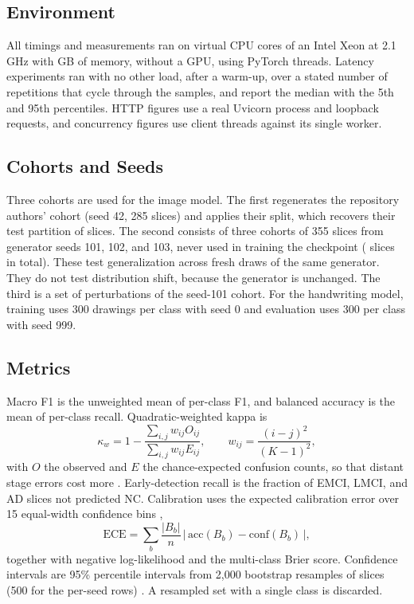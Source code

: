 \documentclass[conference]{IEEEtran}
\begin{document}
\subsection{Environment}
All timings and measurements ran on \CpuCount{} virtual CPU cores of an Intel Xeon at 2.1 GHz with \RamGb{} GB of memory, without a GPU, using \TorchThreads{} PyTorch threads. Latency experiments ran with no other load, after a warm-up, over a stated number of repetitions that cycle through the samples, and report the median with the 5th and 95th percentiles. HTTP figures use a real Uvicorn process and loopback requests, and concurrency figures use client threads against its single worker.

\subsection{Cohorts and Seeds}
Three cohorts are used for the image model. The first regenerates the repository authors' cohort (seed 42, 285 slices) and applies their split, which recovers their test partition of \EOneN{} slices. The second consists of three cohorts of 355 slices from generator seeds 101, 102, and 103, never used in training the checkpoint (\PoolN{} slices in total). These test generalization across fresh draws of the same generator. They do not test distribution shift, because the generator is unchanged. The third is a set of perturbations of the seed-101 cohort. For the handwriting model, training uses 300 drawings per class with seed 0 and evaluation uses 300 per class with seed 999.

\subsection{Metrics}
Macro F1 is the unweighted mean of per-class F1, and balanced accuracy is the mean of per-class recall. Quadratic-weighted kappa is
\begin{equation}
\kappa_w = 1-\frac{\sum_{i,j} w_{ij}O_{ij}}{\sum_{i,j} w_{ij}E_{ij}}, \qquad w_{ij}=\frac{(i-j)^2}{(K-1)^2},
\label{eq:kappa}
\end{equation}
with $O$ the observed and $E$ the chance-expected confusion counts, so that distant stage errors cost more \cite{kappa}. Early-detection recall is the fraction of EMCI, LMCI, and AD slices not predicted NC. Calibration uses the expected calibration error over 15 equal-width confidence bins \cite{guo},
\begin{equation}
\mathrm{ECE}=\sum_{b}\frac{|B_b|}{n}\,\big|\,\mathrm{acc}(B_b)-\mathrm{conf}(B_b)\,\big|,
\label{eq:ece}
\end{equation}
together with negative log-likelihood and the multi-class Brier score. Confidence intervals are 95\% percentile intervals from 2,000 bootstrap resamples of slices (500 for the per-seed rows) \cite{bootstrap}. A resampled set with a single class is discarded.
\end{document}
